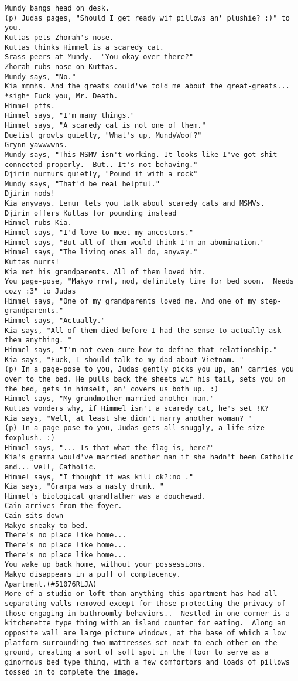 \begin{verbatim}
Mundy bangs head on desk.
(p) Judas pages, "Should I get ready wif pillows an' plushie? :)" to you.
Kuttas pets Zhorah's nose.
Kuttas thinks Himmel is a scaredy cat.
Srass peers at Mundy.  "You okay over there?"
Zhorah rubs nose on Kuttas.
Mundy says, "No."
Kia mmmhs. And the greats could've told me about the great-greats... *sigh* Fuck you, Mr. Death.
Himmel pffs.
Himmel says, "I'm many things."
Himmel says, "A scaredy cat is not one of them."
Duelist growls quietly, "What's up, MundyWoof?"
Grynn yawwwwns.
Mundy says, "This MSMV isn't working. It looks like I've got shit connected properly.  But.. It's not behaving."
Djirin murmurs quietly, "Pound it with a rock"
Mundy says, "That'd be real helpful."
Djirin nods!
Kia anyways. Lemur lets you talk about scaredy cats and MSMVs.
Djirin offers Kuttas for pounding instead
Himmel rubs Kia.
Himmel says, "I'd love to meet my ancestors."
Himmel says, "But all of them would think I'm an abomination."
Himmel says, "The living ones all do, anyway."
Kuttas murrs!
Kia met his grandparents. All of them loved him.
You page-pose, "Makyo rrwf, nod, definitely time for bed soon.  Needs cozy :3" to Judas
Himmel says, "One of my grandparents loved me. And one of my step-grandparents."
Himmel says, "Actually."
Kia says, "All of them died before I had the sense to actually ask them anything. "
Himmel says, "I'm not even sure how to define that relationship."
Kia says, "Fuck, I should talk to my dad about Vietnam. "
(p) In a page-pose to you, Judas gently picks you up, an' carries you over to the bed. He pulls back the sheets wif his tail, sets you on the bed, gets in himself, an' covers us both up. :)
Himmel says, "My grandmother married another man."
Kuttas wonders why, if Himmel isn't a scaredy cat, he's set !K?
Kia says, "Well, at least she didn't marry another woman? "
(p) In a page-pose to you, Judas gets all snuggly, a life-size foxplush. :)
Himmel says, "... Is that what the flag is, here?"
Kia's gramma would've married another man if she hadn't been Catholic and... well, Catholic.
Himmel says, "I thought it was kill_ok?:no ."
Kia says, "Grampa was a nasty drunk. "
Himmel's biological grandfather was a douchewad.
Cain arrives from the foyer.
Cain sits down
Makyo sneaky to bed.
There's no place like home...
There's no place like home...
There's no place like home...
You wake up back home, without your possessions.
Makyo disappears in a puff of complacency.
Apartment.(#51076RLJA)
More of a studio or loft than anything this apartment has had all separating walls removed except for those protecting the privacy of those engaging in bathroomly behaviors..  Nestled in one corner is a kitchenette type thing with an island counter for eating.  Along an opposite wall are large picture windows, at the base of which a low platform surrounding two mattresses set next to each other on the ground, creating a sort of soft spot in the floor to serve as a ginormous bed type thing, with a few comfortors and loads of pillows tossed in to complete the image.

\end{verbatim}
